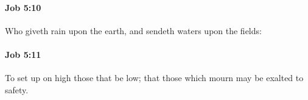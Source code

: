 		\paragraph{Job 5:10} %
			\label{JOB-5-10}

			Who giveth rain upon the earth, and sendeth waters upon the fields:


		\paragraph{Job 5:11} %
			\label{JOB-5-11}

			To set up on high those that be low; that those which mourn may be exalted to safety.


